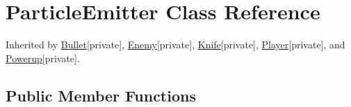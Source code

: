 \hypertarget{class_particle_emitter}{\section{Particle\+Emitter Class Reference}
\label{class_particle_emitter}
}


Inherited by \hyperlink{class_bullet}{Bullet}{\ttfamily  \mbox{[}private\mbox{]}}, \hyperlink{class_enemy}{Enemy}{\ttfamily  \mbox{[}private\mbox{]}}, \hyperlink{class_knife}{Knife}{\ttfamily  \mbox{[}private\mbox{]}}, \hyperlink{class_player}{Player}{\ttfamily  \mbox{[}private\mbox{]}}, and \hyperlink{class_powerup}{Powerup}{\ttfamily  \mbox{[}private\mbox{]}}.

\subsection*{Public Member Functions}
